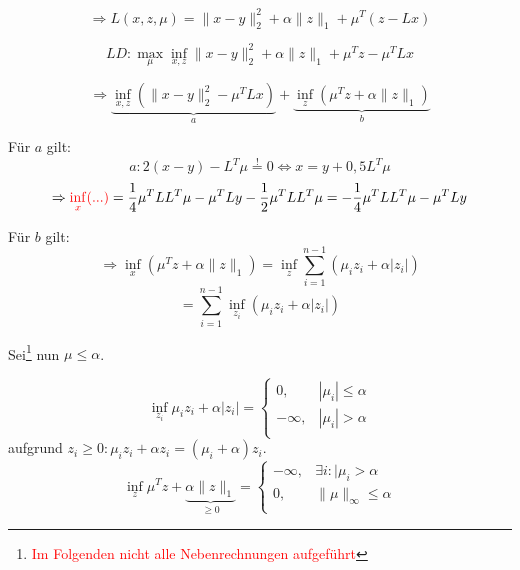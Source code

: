 \documentclass[ngerman, a4paper,12pt]{article}
\begin{document}
\begin{equation*}
\Rightarrow L(x,z,\mu)=\|x-y\|_2^2+\alpha \|z\|_1+\mu^T(z-Lx)
\end{equation*}

\begin{equation*}
LD: \max_{\mu} \inf_{x,z} \|x-y\|_2^2+\alpha\|z\|_1+\mu^Tz-\mu^TLx  
\end{equation*}

\begin{equation*}
  \Rightarrow \underbrace{\inf_{x,z} (\|x-y\|_2^2-\mu^TLx)}_{a} + \underbrace{\inf_z(\mu^Tz+\alpha\|z\|_1)}_{b}
\end{equation*}

Für $a$ gilt:
\begin{equation*}
  a: 2(x-y)-L^T\mu\stackrel{!}{=} 0 \Leftrightarrow x=y+0,5L^T\mu
\end{equation*}
\begin{equation*}
  \Rightarrow \textcolor{red}{\inf_x(...)}=\frac{1}{4}\mu^TLL^T\mu-\mu^TLy-\frac{1}{2}\mu^TLL^T\mu=-\frac{1}{4}\mu^TLL^T\mu-\mu^TLy
\end{equation*}


Für $b$ gilt:
\begin{equation*}
  \Rightarrow \inf_x (\mu^Tz+\alpha\|z\|_1)=\inf_z \sum_{i=1}^{n-1}(\mu_iz_i+\alpha|z_i|)
\end{equation*}
\begin{equation*}
  = \sum_{i=1}^{n-1} \inf_{z_i} (\mu_iz_i+\alpha|z_i|)
\end{equation*}

Sei\footnote{\textcolor{red}{Im Folgenden nicht alle Nebenrechnungen aufgeführt}} nun $\mu\leq\alpha$.

\begin{equation*}
\inf_{z_i} \mu_iz_i+\alpha|z_i|=\begin{cases}
	0,& |\mu_i|\leq \alpha\\
	-\infty,& |\mu_i|>\alpha\\
\end{cases}
\end{equation*}
aufgrund $z_i\geq0:\mu_iz_i+\alpha z_i=(\mu_i+\alpha)z_i$.
\begin{equation*}
  \inf_z \mu^Tz+\underbrace{\alpha\|z\|_1}_{\geq0}=\begin{cases}
  	-\infty,&\exists i:|\mu_i>\alpha\\
  	0,&\|\mu\|_\infty\leq\alpha\\
  \end{cases}
\end{equation*}
\end{document}
